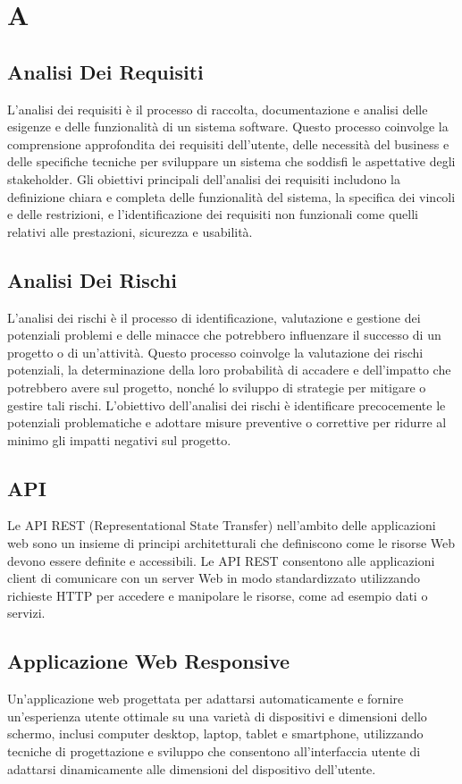 \section{A} 
\subsection{Analisi Dei Requisiti} 
L'analisi dei requisiti è il processo di raccolta, documentazione e analisi delle esigenze e delle funzionalità di un sistema software. Questo processo coinvolge la comprensione approfondita dei requisiti dell'utente, delle necessità del business e delle specifiche tecniche per sviluppare un sistema che soddisfi le aspettative degli stakeholder. Gli obiettivi principali dell'analisi dei requisiti includono la definizione chiara e completa delle funzionalità del sistema, la specifica dei vincoli e delle restrizioni, e l'identificazione dei requisiti non funzionali come quelli relativi alle prestazioni, sicurezza e usabilità.
\subsection{Analisi Dei Rischi} 
L'analisi dei rischi è il processo di identificazione, valutazione e gestione dei potenziali problemi e delle minacce che potrebbero influenzare il successo di un progetto o di un'attività. Questo processo coinvolge la valutazione dei rischi potenziali, la determinazione della loro probabilità di accadere e dell'impatto che potrebbero avere sul progetto, nonché lo sviluppo di strategie per mitigare o gestire tali rischi. L'obiettivo dell'analisi dei rischi è identificare precocemente le potenziali problematiche e adottare misure preventive o correttive per ridurre al minimo gli impatti negativi sul progetto.
\subsection{API} 
Le API REST (Representational State Transfer) nell'ambito delle applicazioni web sono un insieme di principi architetturali che definiscono come le risorse Web devono essere definite e accessibili. Le API REST consentono alle applicazioni client di comunicare con un server Web in modo standardizzato utilizzando richieste HTTP per accedere e manipolare le risorse, come ad esempio dati o servizi.
\subsection{Applicazione Web Responsive} 
Un'applicazione web progettata per adattarsi automaticamente e fornire un'esperienza utente ottimale su una varietà di dispositivi e dimensioni dello schermo, inclusi computer desktop, laptop, tablet e smartphone, utilizzando tecniche di progettazione e sviluppo che consentono all'interfaccia utente di adattarsi dinamicamente alle dimensioni del dispositivo dell'utente.
